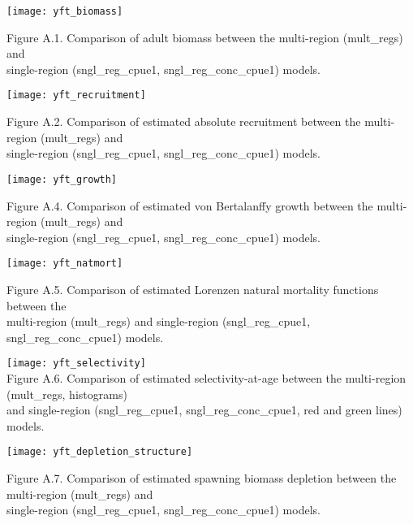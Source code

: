 \documentclass{SCreport}
\begin{document}
\newpage

\small

\texttt{[image: yft\_biomass]}

Figure A.1. Comparison of adult biomass between the multi-region (mult\_regs)
and\\[-0.8ex]
single-region (sngl\_reg\_cpue1, sngl\_reg\_conc\_cpue1) models.

\vspace{1ex}

\texttt{[image: yft\_recruitment]}

Figure A.2. Comparison of estimated absolute recruitment between the
multi-region (mult\_regs) and\\[-0.8ex]
single-region (sngl\_reg\_cpue1, sngl\_reg\_conc\_cpue1) models.

\vspace{1ex}

\texttt{[image: yft\_growth]}

Figure A.4. Comparison of estimated von Bertalanffy growth between the
multi-region (mult\_regs) and\\[-0.8ex]
single-region (sngl\_reg\_cpue1, sngl\_reg\_conc\_cpue1) models.

\vspace{1ex}

\texttt{[image: yft\_natmort]}

Figure A.5. Comparison of estimated Lorenzen natural mortality functions between
the\\[-0.8ex]
multi-region (mult\_regs) and single-region (sngl\_reg\_cpue1,
sngl\_reg\_conc\_cpue1) models.

\vspace{1ex}

\newpage

\texttt{[image: yft\_selectivity]}\\[1ex]

Figure A.6. Comparison of estimated selectivity-at-age between the multi-region
(mult\_regs, histograms)\\[-0.8ex]
and single-region (sngl\_reg\_cpue1, sngl\_reg\_conc\_cpue1, red and green
lines) models.

\vspace{1ex}

\texttt{[image: yft\_depletion\_structure]}

Figure A.7. Comparison of estimated spawning biomass depletion between the
multi-region (mult\_regs) and\\[-0.8ex]
single-region (sngl\_reg\_cpue1, sngl\_reg\_conc\_cpue1) models.
\end{document}
